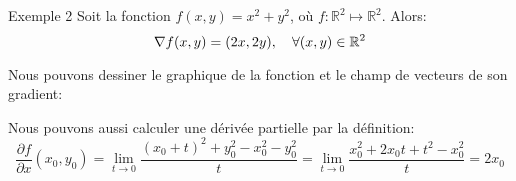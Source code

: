 \documentclass[a4paper]{article}
\begin{document}
\begin{parag}{Exemple 2}
    Soit la fonction $f\left(x, y\right) = x^2 + y^2$, où $f: \mathbb{R}^2 \mapsto \mathbb{R}^2$. Alors: 
    \[\nabla f\left(x, y\right) = \left(2x, 2y\right), \mathspace \forall \left(x, y\right) \in \mathbb{R}^2\]
    
    Nous pouvons dessiner le graphique de la fonction et le champ de vecteurs de son gradient:
    \begin{center}
    \begin{minipage}{0.49\textwidth}
    \end{minipage}
    \begin{minipage}{0.49\textwidth}
    \end{minipage}
    \end{center}

    Nous pouvons aussi calculer une dérivée partielle par la définition:
    \[\frac{\partial f}{\partial x}\left(x_0, y_0\right) = \lim_{t \to 0} \frac{\left(x_0 + t\right)^2 + y_0^2 - x_0^2 - y_0^2}{t} = \lim_{t \to 0} \frac{x_0^2 + 2x_0t + t^2 - x_0^2}{t} = 2x_0\]
\end{parag}
\end{document}

